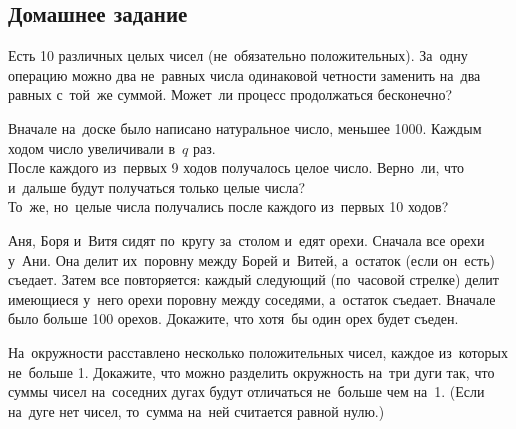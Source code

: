

\subsection*{Домашнее задание}




\begin{problems}

\item
Есть 10 различных целых чисел (не~обязательно положительных).
За~одну операцию можно два не~равных числа одинаковой четности заменить
на~два равных с~той~же суммой.
Может~ли процесс продолжаться бесконечно?

\item
Вначале на~доске было написано натуральное число, меньшее 1000.
Каждым ходом число увеличивали в~$q$ раз.
\\
\subproblem
После каждого из~первых 9 ходов получалось целое число.
Верно~ли, что и~дальше будут получаться только целые числа?
\\
\subproblem
То~же, но~целые числа получались после каждого из~первых 10 ходов?

\item
Аня, Боря и~Витя сидят по~кругу за~столом и~едят орехи.
Сначала все орехи у~Ани.
Она делит их~поровну между Борей и~Витей, а~остаток (если он~есть) съедает.
Затем все повторяется: каждый следующий (по~часовой стрелке) делит имеющиеся
у~него орехи поровну между соседями, а~остаток съедает.
Вначале было больше 100 орехов.
Докажите, что хотя~бы один орех будет съеден.

\item
На~окружности расставлено несколько положительных чисел, каждое из~которых
не~больше 1.
Докажите, что можно разделить окружность на~три дуги так, что суммы чисел
на~соседних дугах будут отличаться не~больше чем на~1.
(Если на~дуге нет чисел, то~сумма на~ней считается равной нулю.)

\end{problems}

